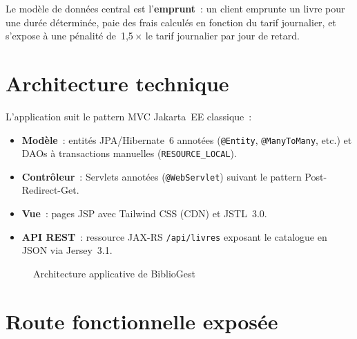 \documentclass[12pt,a4paper]{report}
\begin{document}
Le modèle de données central est l'\textbf{emprunt}~: un client emprunte un
livre pour une durée déterminée, paie des frais calculés en fonction du tarif
journalier, et s'expose à une pénalité de~1,5\,× le tarif journalier par jour
de retard.

\section{Architecture technique}

L'application suit le pattern MVC Jakarta~EE classique~:

\begin{itemize}
  \item \textbf{Modèle}~: entités JPA/Hibernate~6 annotées
        (\texttt{@Entity}, \texttt{@ManyToMany}, etc.) et DAOs à transactions
        manuelles (\texttt{RESOURCE\_LOCAL}).
  \item \textbf{Contrôleur}~: Servlets annotées (\texttt{@WebServlet}) suivant
        le pattern Post-Redirect-Get.
  \item \textbf{Vue}~: pages JSP avec Tailwind CSS (CDN) et JSTL~3.0.
  \item \textbf{API REST}~: ressource JAX-RS \texttt{/api/livres} exposant le
        catalogue en JSON via Jersey~3.1.
\end{itemize}

\begin{figure}[h!]
\centering
{}
\caption{Architecture applicative de BiblioGest}
\label{fig:archi-app}
\end{figure}

\section{Route fonctionnelle exposée}
\end{document}
